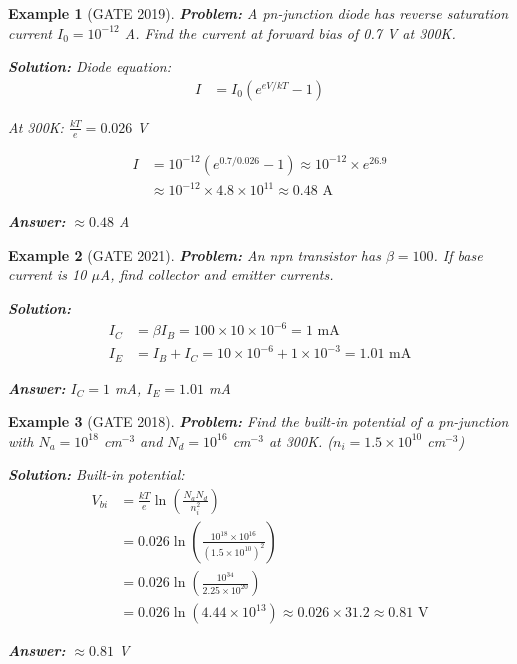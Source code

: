 \documentclass[12pt,a4paper]{article}
\newtheorem{example}{Example}[section]
\newcommand{\ans}[1]{\textcolor{red!70!black}{\textbf{Answer:} #1}}
\newcommand{\sol}{\textcolor{blue!70!black}{\textbf{Solution:}}}
\begin{document}
\begin{example}[GATE 2019]
\textbf{Problem:} A pn-junction diode has reverse saturation current $I_0 = 10^{-12}$ A. Find the current at forward bias of 0.7 V at 300K.

\sol
Diode equation:
\begin{align}
I &= I_0(e^{eV/kT} - 1)
\end{align}

At 300K: $\frac{kT}{e} = 0.026$ V

\begin{align}
I &= 10^{-12}(e^{0.7/0.026} - 1) \approx 10^{-12} \times e^{26.9}\\
&\approx 10^{-12} \times 4.8 \times 10^{11} \approx 0.48 \text{ A}
\end{align}

\ans{$\approx 0.48$ A}
\end{example}

\begin{example}[GATE 2021]
\textbf{Problem:} An npn transistor has $\beta = 100$. If base current is 10 $\mu$A, find collector and emitter currents.

\sol
\begin{align}
I_C &= \beta I_B = 100 \times 10 \times 10^{-6} = 1 \text{ mA}\\
I_E &= I_B + I_C = 10 \times 10^{-6} + 1 \times 10^{-3} = 1.01 \text{ mA}
\end{align}

\ans{$I_C = 1$ mA, $I_E = 1.01$ mA}
\end{example}

\begin{example}[GATE 2018]
\textbf{Problem:} Find the built-in potential of a pn-junction with $N_a = 10^{18}$ cm$^{-3}$ and $N_d = 10^{16}$ cm$^{-3}$ at 300K. ($n_i = 1.5 \times 10^{10}$ cm$^{-3}$)

\sol
Built-in potential:
\begin{align}
V_{bi} &= \frac{kT}{e}\ln\left(\frac{N_a N_d}{n_i^2}\right)\\
&= 0.026 \ln\left(\frac{10^{18} \times 10^{16}}{(1.5 \times 10^{10})^2}\right)\\
&= 0.026 \ln\left(\frac{10^{34}}{2.25 \times 10^{20}}\right)\\
&= 0.026 \ln(4.44 \times 10^{13}) \approx 0.026 \times 31.2 \approx 0.81 \text{ V}
\end{align}

\ans{$\approx 0.81$ V}
\end{example}
\end{document}
